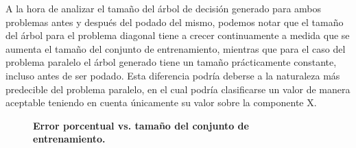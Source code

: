 \documentclass[a4paper, 11pt]{article} %
\begin{document}
A la hora de analizar el tamaño del árbol de decisión generado para ambos
problemas antes y después del podado del mismo, podemos notar que el tamaño del
árbol para el problema diagonal tiene a crecer continuamente a medida que se
aumenta el tamaño del conjunto de entrenamiento, mientras que para el caso del
problema paralelo el árbol generado tiene un tamaño prácticamente constante,
incluso antes de ser podado. Esta diferencia podría deberse a la naturaleza más
predecible del problema paralelo, en el cual podría clasificarse un valor de
manera aceptable teniendo en cuenta únicamente su valor sobre la componente X. 

\begin{figure}[H]
\captionsetup[subfigure]{labelformat=empty}
  \centering
  \caption*{\textbf{Error porcentual vs. tamaño del conjunto de entrenamiento.}}
\end{figure}

\end{document}
